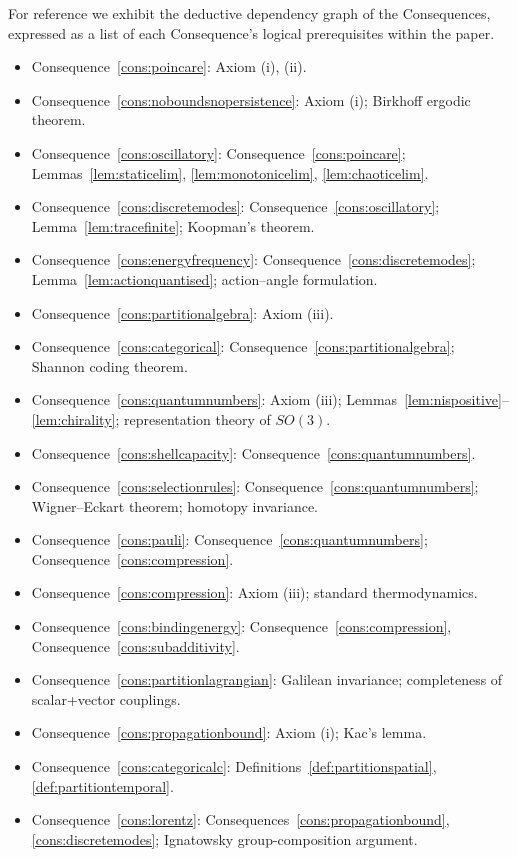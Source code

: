 \documentclass[11pt,twocolumn,a4paper]{article}
\theoremstyle{axiomstyle}
\theoremstyle{conseqstyle}
\theoremstyle{definition}
\theoremstyle{remark}
\begin{document}
For reference we exhibit the deductive dependency graph of the Consequences, expressed as a list of each Consequence's logical prerequisites within the paper.

\begin{itemize}
\item Consequence~\ref{cons:poincare}: Axiom (i), (ii).
\item Consequence~\ref{cons:noboundsnopersistence}: Axiom (i); Birkhoff ergodic theorem.
\item Consequence~\ref{cons:oscillatory}: Consequence~\ref{cons:poincare}; Lemmas~\ref{lem:staticelim}, \ref{lem:monotonicelim}, \ref{lem:chaoticelim}.
\item Consequence~\ref{cons:discretemodes}: Consequence~\ref{cons:oscillatory}; Lemma~\ref{lem:tracefinite}; Koopman's theorem.
\item Consequence~\ref{cons:energyfrequency}: Consequence~\ref{cons:discretemodes}; Lemma~\ref{lem:actionquantised}; action--angle formulation.
\item Consequence~\ref{cons:partitionalgebra}: Axiom (iii).
\item Consequence~\ref{cons:categorical}: Consequence~\ref{cons:partitionalgebra}; Shannon coding theorem.
\item Consequence~\ref{cons:quantumnumbers}: Axiom (iii); Lemmas~\ref{lem:nispositive}--\ref{lem:chirality}; representation theory of $SO(3)$.
\item Consequence~\ref{cons:shellcapacity}: Consequence~\ref{cons:quantumnumbers}.
\item Consequence~\ref{cons:selectionrules}: Consequence~\ref{cons:quantumnumbers}; Wigner--Eckart theorem; homotopy invariance.
\item Consequence~\ref{cons:pauli}: Consequence~\ref{cons:quantumnumbers}; Consequence~\ref{cons:compression}.
\item Consequence~\ref{cons:compression}: Axiom (iii); standard thermodynamics.
\item Consequence~\ref{cons:bindingenergy}: Consequence~\ref{cons:compression}, Consequence~\ref{cons:subadditivity}.
\item Consequence~\ref{cons:partitionlagrangian}: Galilean invariance; completeness of scalar+vector couplings.
\item Consequence~\ref{cons:propagationbound}: Axiom (i); Kac's lemma.
\item Consequence~\ref{cons:categoricalc}: Definitions~\ref{def:partitionspatial}, \ref{def:partitiontemporal}.
\item Consequence~\ref{cons:lorentz}: Consequences~\ref{cons:propagationbound}, \ref{cons:discretemodes}; Ignatowsky group-composition argument.

\end{itemize}
\end{document}

